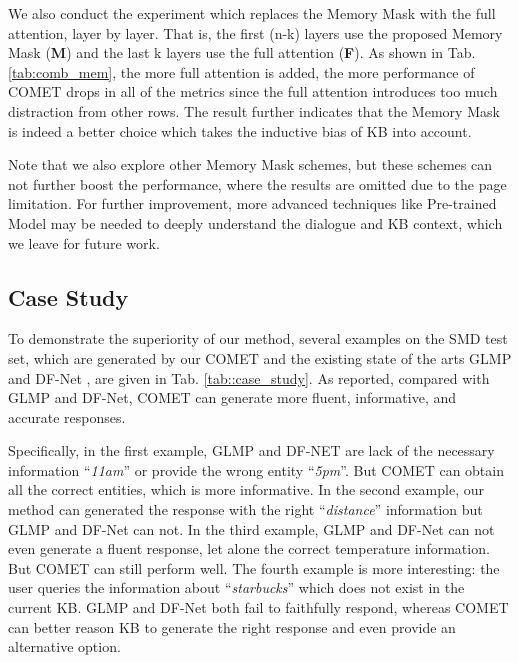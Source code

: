 \documentclass[11pt]{article}
\begin{document}
We also conduct the experiment which replaces the Memory Mask with the full attention, layer by layer. That is, the first (n-k) layers use the proposed Memory Mask (\textbf{M}) and the last k layers use the full attention (\textbf{F}).
As shown in Tab. \ref{tab:comb_mem}, the more full attention is added, the more performance of COMET drops in all of the metrics since the full attention introduces too much distraction from other rows. 
The result further indicates that the Memory Mask is indeed a better choice which takes the inductive bias of KB into account.







Note that we also explore other Memory Mask schemes, but these schemes can not further boost the performance, where the results are omitted due to the page limitation. For further improvement, more advanced techniques like Pre-trained Model \cite{devlin2018bert,radford2019language} may be needed to deeply understand the dialogue and KB context, which we leave for future work.


\subsection{Case Study}
To demonstrate the superiority of our method, several examples on the SMD test set, which are generated by our COMET and the existing state of the arts GLMP \cite{wu2018globaltolocal} and DF-Net \cite{qin-etal-2020-dynamic}, are given in Tab. \ref{tab::case_study}. 
As reported, compared with GLMP and DF-Net, COMET can generate more fluent, informative, and accurate responses. 

Specifically, 
in the first example, GLMP and DF-NET are lack of the necessary information ``\textit{11am}'' or provide the wrong entity ``\textit{5pm}''. But COMET can obtain all the correct entities, 
which is more informative. 
In the second example, our method can generated the response with the right ``\textit{distance}'' information but GLMP and DF-Net can not.
In the third example, GLMP and DF-Net can not even generate a fluent response, let alone the correct temperature information. But COMET can still perform well. 
The fourth example is more interesting: the user queries the information about ``\textit{starbucks}'' which does not exist in the current KB. GLMP and DF-Net both fail to faithfully respond, whereas COMET can better reason KB to generate the right response and even provide an alternative option.
\end{document}
